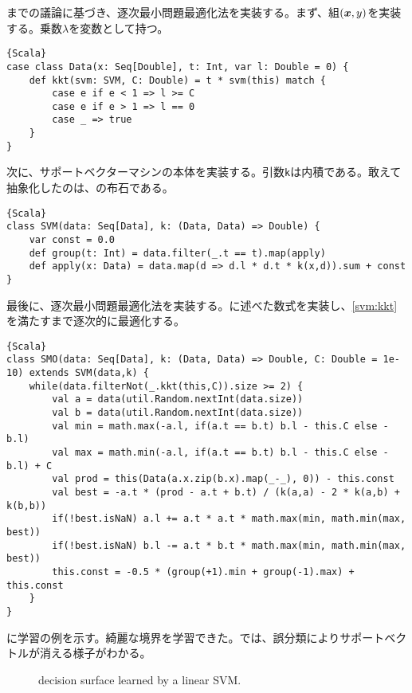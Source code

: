 \documentclass[10pt,a4paper]{book}
\begin{document}
までの議論に基づき、逐次最小問題最適化法を実装する。まず、組$\pair{\bm{x}}{y}$を実装する。乗数$\lambda$を変数として持つ。

\begin{Verbatim}{Scala}
case class Data(x: Seq[Double], t: Int, var l: Double = 0) {
	def kkt(svm: SVM, C: Double) = t * svm(this) match {
		case e if e < 1 => l >= C
		case e if e > 1 => l == 0
		case _ => true
	}
}
\end{Verbatim}

次に、サポートベクターマシンの本体を実装する。引数\texttt{k}は内積である。敢えて抽象化したのは、の布石である。

\begin{Verbatim}{Scala}
class SVM(data: Seq[Data], k: (Data, Data) => Double) {
	var const = 0.0
	def group(t: Int) = data.filter(_.t == t).map(apply)
	def apply(x: Data) = data.map(d => d.l * d.t * k(x,d)).sum + const
}
\end{Verbatim}

最後に、逐次最小問題最適化法を実装する。に述べた数式を実装し、\eqref{svm:kkt}を満たすまで逐次的に最適化する。

\begin{Verbatim}{Scala}
class SMO(data: Seq[Data], k: (Data, Data) => Double, C: Double = 1e-10) extends SVM(data,k) {
	while(data.filterNot(_.kkt(this,C)).size >= 2) {
		val a = data(util.Random.nextInt(data.size))
		val b = data(util.Random.nextInt(data.size))
		val min = math.max(-a.l, if(a.t == b.t) b.l - this.C else -b.l)
		val max = math.min(-a.l, if(a.t == b.t) b.l - this.C else -b.l) + C
		val prod = this(Data(a.x.zip(b.x).map(_-_), 0)) - this.const
		val best = -a.t * (prod - a.t + b.t) / (k(a,a) - 2 * k(a,b) + k(b,b))
		if(!best.isNaN) a.l += a.t * a.t * math.max(min, math.min(max, best))
		if(!best.isNaN) b.l -= a.t * b.t * math.max(min, math.min(max, best))
		this.const = -0.5 * (group(+1).min + group(-1).max) + this.const
	}
}
\end{Verbatim}

に学習の例を示す。綺麗な境界を学習できた。では、誤分類によりサポートベクトルが消える様子がわかる。

\begin{figure}[h]
\centering
{}
\caption{decision surface learned by a linear SVM.\label{fig:svm:line}}
\end{figure}
\end{document}
